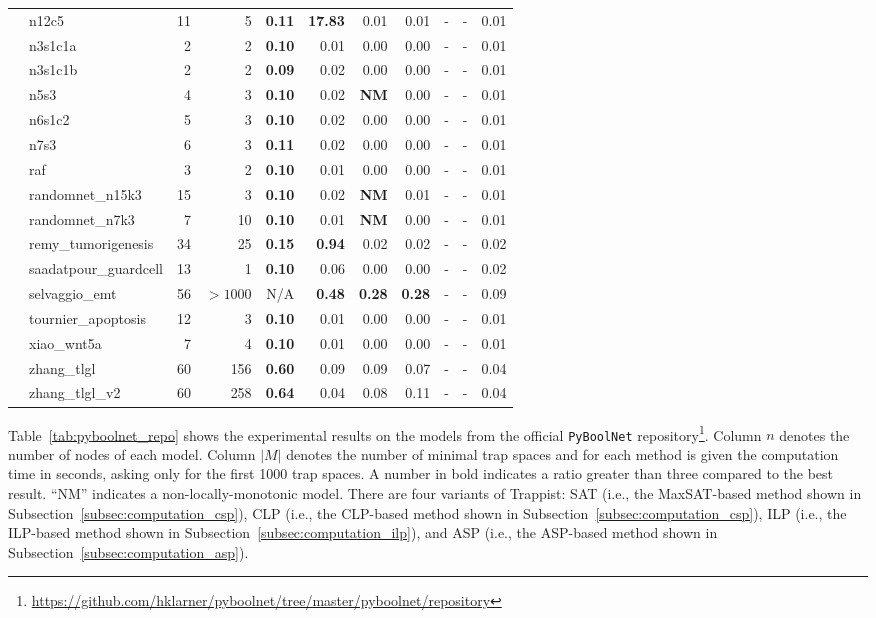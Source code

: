 \documentclass[preprint,12pt]{elsarticle}
\newcounter{rownumber}
\newcommand\rownb{\stepcounter{rownumber}\arabic{rownumber}}
\begin{document}
\begin{table}[!htb]
{\begin{tabular}{rlrrrrrrrrr}
    \rownb & n12c5 & 11 & 5 & \textbf{0.11} & \textbf{17.83} & 0.01 & 0.01 & - & - & 0.01\\
    \rownb & n3s1c1a & 2 & 2 & \textbf{0.10} & 0.01 & 0.00 & 0.00 & - & - & 0.01\\
    \rownb & n3s1c1b & 2 & 2 & \textbf{0.09} & 0.02 & 0.00 & 0.00 & - & - & 0.01\\
    \rownb & n5s3 & 4 & 3 & \textbf{0.10} & 0.02 & \textbf{NM} & 0.00 & - & - & 0.01\\
    \rownb & n6s1c2 & 5 & 3 & \textbf{0.10} & 0.02 & 0.00 & 0.00 & - & - & 0.01\\
    \rownb & n7s3 & 6 & 3 & \textbf{0.11} & 0.02 & 0.00 & 0.00 & - & - & 0.01\\
    \rownb & raf & 3 & 2 & \textbf{0.10} & 0.01 & 0.00 & 0.00 & - & - & 0.01\\
    \rownb & randomnet\_n15k3 & 15 & 3 & \textbf{0.10} & 0.02 & \textbf{NM} & 0.01 & - & - & 0.01\\
    \rownb & randomnet\_n7k3 & 7 & 10 & \textbf{0.10} & 0.01 & \textbf{NM} & 0.00 & - & - & 0.01\\
    \rownb & remy\_tumorigenesis & 34 & 25 & \textbf{0.15} & \textbf{0.94} & 0.02 & 0.02 & - & - & 0.02\\
    \rownb & saadatpour\_guardcell & 13 & 1 & \textbf{0.10} & 0.06 & 0.00 & 0.00 & - & - & 0.02\\
    \rownb & selvaggio\_emt & 56 & $>1000$ & N/A & \textbf{0.48} & \textbf{0.28} & \textbf{0.28} & - & - & 0.09\\
    \rownb & tournier\_apoptosis & 12 & 3 & \textbf{0.10} & 0.01 & 0.00 & 0.00 & - & - & 0.01\\
    \rownb & xiao\_wnt5a & 7 & 4 & \textbf{0.10} & 0.01 & 0.00 & 0.00 & - & - & 0.01\\
    \rownb & zhang\_tlgl & 60 & 156 & \textbf{0.60} & 0.09 & 0.09 & 0.07 & - & - & 0.04\\
    \rownb & zhang\_tlgl\_v2 & 60 & 258 & \textbf{0.64} & 0.04 & 0.08 & 0.11 & - & - & 0.04\\
    \bottomrule
  \end{tabular}
  }
\end{table}
\setcounter{rownumber}{0}

Table~\ref{tab:pyboolnet_repo} shows the experimental results on the models from the official \texttt{PyBoolNet} repository\footnote{\url{https://github.com/hklarner/pyboolnet/tree/master/pyboolnet/repository}}.
Column \(n\) denotes the number of nodes of each model. 
Column \(|M|\) denotes the number of minimal trap spaces and for each method is given the computation time in seconds, asking only for the first 1000 trap spaces.
A number in bold indicates a ratio greater than three compared to the best result. 
``NM'' indicates a non-locally-monotonic model.
There are four variants of Trappist: SAT (i.e., the MaxSAT-based method shown in Subsection~\ref{subsec:computation_csp}), CLP (i.e., the CLP-based method shown in Subsection~\ref{subsec:computation_csp}), ILP (i.e., the ILP-based method shown in Subsection~\ref{subsec:computation_ilp}), and ASP (i.e., the ASP-based method shown in Subsection~\ref{subsec:computation_asp}).
    
\end{document}
